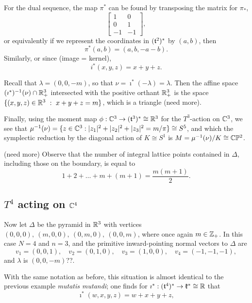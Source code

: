 For the dual sequence, the map $\pi^{\ast}$ can be found by transposing the matrix for $\pi_{\ast}$,
\begin{equation*}
	\begin{bmatrix}
	1 & 0 \\
	0 & 1 \\
	-1 & -1
	\end{bmatrix},
\end{equation*}
or equivalently if we represent the coordinates in $(\mathfrak{t}^{2})^{\ast}$ by $(a,b)$, then
\begin{equation*}
	\pi^{\ast}(a,b) = (a, b, -a-b).
\end{equation*}
Similarly, or since (image = kernel),
\begin{equation*}
	i^{\ast}(x,y,z) = x + y + z.
\end{equation*}

Recall that $\lambda = (0,0,-m)$, so that $\nu = \imath^{\ast}(-\lambda) = \lambda$. Then the affine space $(\imath^{\ast})^{-1}(\nu) \cap \mathbb{R}_{+}^{3}$ intersected with the positive orthant $\mathbb{R}_{+}^{3}$ is the space $\{(x,y,z)\in \mathbb{R}^{3}\ :\ x + y + z = m \}$, which is a triangle (need more).

Finally, using the moment map $\phi:\mathbb{C}^{3} \rightarrow (\mathfrak{t}^{3})^{\ast} \cong \mathbb{R}^{3}$ for the $T^{3}$-action on $\mathbb{C}^{3}$, we see that $\mu^{-1}(\nu) = \{ z \in \mathbb{C}^{3} : | z_{1} |^{2} + | z_{2} |^{2} + | z_{3} |^{2} = m/\pi \} \cong S^{5}$, and which the symplectic reduction by the diagonal action of $K \cong S^{1}$ is $M = \mu^{-1}(\nu)/K \cong \mathbb{C}\mathbb{P}^{2}$.

(need more) Observe that the number of integral lattice points contained in $\Delta$, including those on the boundary, is equal to
\begin{equation*}
	1 + 2 + \ldots + m + (m + 1) = \frac{m(m+1)}{2}.
\end{equation*}

\subsection{$T^{4}$ acting on $\mathbb{C}^{4}$}

Now let $\Delta$ be the pyramid in $\mathbb{R}^{3}$ with vertices $(0,0,0),\ (m,0,0),\ (0,m,0),\ (0,0,m)$, where once again $m \in \mathbb{Z}_{+}$. In this case $N = 4$ and $n = 3$, and the primitive inward-pointing normal vectors to $\Delta$ are
\begin{equation*}
v_{1} = (0,0,1),\quad v_{2} = (0,1,0),\quad v_{3} = (1,0,0),\quad v_{4} = (-1,-1,-1),
\end{equation*}
and $\lambda$ is $(0,0,-m)$??.

With the same notation as before, this situation is almost identical to the previous example \emph{mutatis mutandi}; one finds for $\imath^{\ast}:(\mathfrak{t}^{4})^{\ast} \rightarrow \mathfrak{k}^{\ast} \cong \mathbb{R}$ that
\begin{equation*}
	\imath^{\ast}(w,x,y,z) = w + x + y + z,
\end{equation*}